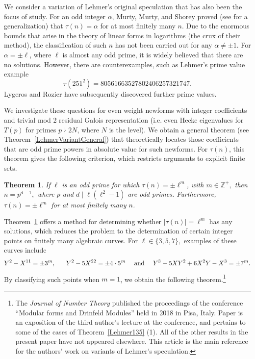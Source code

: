 \documentclass[12pt]{amsart}
\newtheorem{thm}{Theorem}[section]
\newcommand{\Z}{\mathbb{Z}}
\newcommand{\?}{\color{red}?}
\numberwithin{equation}{section}
\begin{document}
 We consider a variation of Lehmer's original speculation that has also been the focus of study. For an  odd integer $\alpha$,
 Murty, Murty, and Shorey \cite{MMS} proved (see \cite{MM} for a generalization) that
 $\tau(n)=\alpha$ for at most finitely many $n$. 
 Due to the enormous bounds that  arise in the theory of linear forms in logarithms (the crux of their method), the classification
 of such $n$ has not been carried out for any $\alpha\neq \pm 1$. For $\alpha=\pm \ell$, where $\ell$ is almost any odd prime,
 it is widely believed that there are  no solutions.  However, there are counterexamples, such as
Lehmer's prime value example \cite{LehmerMonthly}
\begin{equation}\label{LehmerPrime}
\tau(251^2)=80561663527802406257321747.
\end{equation}
\noindent 
Lygeros and Rozier \cite{LR} have subsequently discovered further prime values.

 
We investigate these questions for even weight newforms with integer coefficients and trivial mod 2 residual Galois representation (i.e. even Hecke eigenvalues for $T(p)$ for primes $p\nmid 2N$, where $N$ is the level).
We obtain a general theorem (see Theorem~\ref{LehmerVariantGeneral}) that theoretically locates those coefficients that are odd prime powers in absolute value for such newforms. For $\tau(n)$, this theorem gives the following criterion, which restricts arguments to explicit finite sets.

\begin{thm}\label{LehmerVariation}
If $\ell$ is an odd prime for which $\tau(n)=\pm\ell^m$, with $m\in \Z^{+},$ then $n=p^{d-1},$ where $p$ and $d\mid \ell( \ell^2-1)$
are odd primes. Furthermore,  $\tau(n)=\pm \ell^m$ for at most finitely many $n$.
\end{thm}

Theorem~\ref{LehmerVariation} offers a method for determining whether $|\tau(n)|=\ell^m$ has any solutions, which reduces the
problem to the determination of certain integer points on finitely many algebraic curves.  For $\ell \in \{3, 5, 7\},$ 
examples of these curves include
\begin{equation}\label{HyperEquations}
 Y^2-X^{11}=\pm 3^m,\ \ \ \ \ 
 Y^2-5X^{22}=\pm 4\cdot 5^m \ \ \ \ {\text {\rm and}}\ \ \ \ Y^{3}-5XY^2+6X^2Y-X^3=\pm 7^m.
\end{equation}
By classifying such points when $m=1$, we obtain 
the following theorem.\footnote{The {\it Journal of Number Theory} published the proceedings of the conference ``Modular forms and Drinfeld Modules'' held in 2018 in Pisa, Italy. Paper \cite{PaperJNT}  is an exposition of the third author's  lecture at the conference, and pertains to some of the cases  of Theorem~\ref{Lehmer135} (1). All of the other results in the present paper have not appeared elsewhere. This article is the main reference for the authors' work on variants of Lehmer's speculation.}
\end{document}
